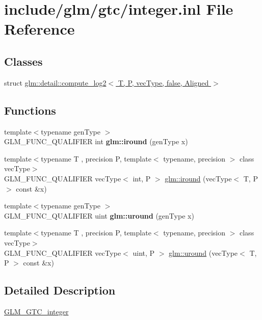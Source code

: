 \hypertarget{gtc_2integer_8inl}{}\section{include/glm/gtc/integer.inl File Reference}
\label{gtc_2integer_8inl}
\subsection*{Classes}
\begin{DoxyCompactItemize}
\item 
struct \hyperlink{structglm_1_1detail_1_1compute__log2_3_01T_00_01P_00_01vecType_00_01false_00_01Aligned_01_4}{glm\+::detail\+::compute\+\_\+log2$<$ T, P, vec\+Type, false, Aligned $>$}
\end{DoxyCompactItemize}
\subsection*{Functions}
\begin{DoxyCompactItemize}
\item 
\mbox{\label{gtc_2integer_8inl_ac64c94481641999914b9eab162db3a0f}} 
{\footnotesize template$<$typename gen\+Type $>$ }\\G\+L\+M\+\_\+\+F\+U\+N\+C\+\_\+\+Q\+U\+A\+L\+I\+F\+I\+ER int {\bfseries glm\+::iround} (gen\+Type x)
\item 
{\footnotesize template$<$typename T , precision P, template$<$ typename, precision $>$ class vec\+Type$>$ }\\G\+L\+M\+\_\+\+F\+U\+N\+C\+\_\+\+Q\+U\+A\+L\+I\+F\+I\+ER vec\+Type$<$ int, P $>$ \hyperlink{group__gtc__integer_ga0a42ffb863cc980e91f98d2f5766de20}{glm\+::iround} (vec\+Type$<$ T, P $>$ const \&x)
\item 
\mbox{\label{gtc_2integer_8inl_a2929f3403ed935b4537cb5e5b51219ee}} 
{\footnotesize template$<$typename gen\+Type $>$ }\\G\+L\+M\+\_\+\+F\+U\+N\+C\+\_\+\+Q\+U\+A\+L\+I\+F\+I\+ER uint {\bfseries glm\+::uround} (gen\+Type x)
\item 
{\footnotesize template$<$typename T , precision P, template$<$ typename, precision $>$ class vec\+Type$>$ }\\G\+L\+M\+\_\+\+F\+U\+N\+C\+\_\+\+Q\+U\+A\+L\+I\+F\+I\+ER vec\+Type$<$ uint, P $>$ \hyperlink{group__gtc__integer_gab61b8546aafdf58f119eb892b212607c}{glm\+::uround} (vec\+Type$<$ T, P $>$ const \&x)
\end{DoxyCompactItemize}


\subsection{Detailed Description}
\hyperlink{group__gtc__integer}{G\+L\+M\+\_\+\+G\+T\+C\+\_\+integer} 